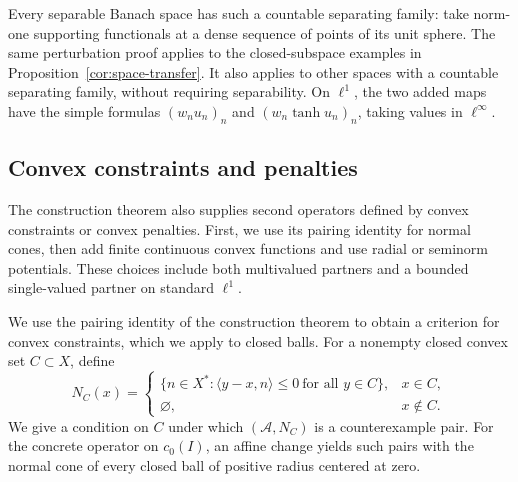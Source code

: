 \documentclass[11pt]{article}
\newcommand{\pair}[2]{\langle #1,#2\rangle}
\theoremstyle{definition}
\theoremstyle{remark}
\begin{document}
Every separable Banach space has such a countable separating family: take norm-one supporting functionals at a dense sequence of points of its unit sphere. The same perturbation proof applies to the closed-subspace examples in Proposition~\ref{cor:space-transfer}. It also applies to other spaces with a countable separating family, without requiring separability. On $\ell^1$, the two added maps have the simple formulas $(w_nu_n)_n$ and $(w_n\tanh u_n)_n$, taking values in $\ell^\infty$.

\subsection{Convex constraints and penalties}
\label{subsec:convex-partners}

The construction theorem also supplies second operators defined by convex constraints or convex penalties. First, we use its pairing identity for normal cones, then add finite continuous convex functions and use radial or seminorm potentials. These choices include both multivalued partners and a bounded single-valued partner on standard $\ell^1$.

We use the pairing identity of the construction theorem to obtain a criterion for convex constraints, which we apply to closed balls. For a nonempty closed convex set $C\subset X$, define
\[
N_C(x)=
\begin{cases}
\{n\in X^*:\pair{y-x}{n}\le0\ \text{for all }y\in C\},&x\in C,\\
\varnothing,&x\notin C.
\end{cases}
\]
We give a condition on $C$ under which $(\mathcal A,N_C)$ is a counterexample pair. For the concrete operator on $c_0(I)$, an affine change yields such pairs with the normal cone of every closed ball of positive radius centered at zero.
\end{document}
